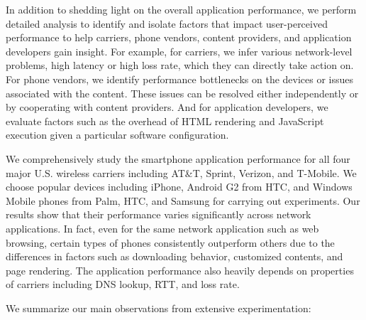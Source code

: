 In addition to shedding light on the overall application performance, we perform detailed analysis to identify and isolate
factors that impact user-perceived performance to help carriers,
phone vendors, content providers, and application developers gain 
insight. For example, for carriers, we infer various network-level 
problems, \eg high latency or high loss rate, which they can directly 
take action on. For phone vendors, we identify performance bottlenecks 
on the devices or issues associated with the content. These issues can
be resolved either independently or by cooperating with content 
providers. And for application developers, we evaluate factors such 
as the overhead of HTML rendering and JavaScript execution given a 
particular software configuration.

We comprehensively study the smartphone application performance
for all four major U.S. wireless carriers including AT\&T, Sprint,
Verizon, and T-Mobile. We choose popular devices including iPhone,
Android G2 from HTC, and Windows Mobile phones from Palm, HTC, and 
Samsung for carrying out experiments. Our results show that their
performance varies significantly across network applications. In 
fact, even for the same network application such as web browsing, 
certain types of phones consistently outperform others due to the 
differences in factors such as downloading behavior, customized 
contents, and page rendering. The application performance also 
heavily depends on properties of carriers including DNS lookup, 
RTT, and loss rate.

We summarize our main observations from extensive experimentation:


